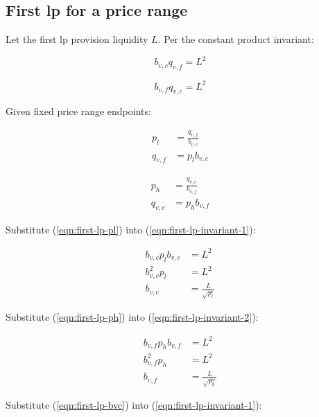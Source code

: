 \documentclass[table, twocolumn]{article}
\begin{document}
\subsection{First \gls{lp} for a price range}

Let the first \gls{lp} provision liquidity $L$. Per the constant product invariant:

\begin{equation} \label{eqn:first-lp-invariant-1}
  b_{v, c} q_{v, f} = L^2
\end{equation}

\begin{equation} \label{eqn:first-lp-invariant-2}
  b_{v, f} q_{v, c} = L^2
\end{equation}

Given fixed price range endpoints:

\begin{align} \label{eqn:first-lp-pl}
  p_l      & = \frac{q_{v, f}}{b_{v, c}} \nonumber \\
  q_{v, f} & = p_l b_{v, c}
\end{align}

\begin{align} \label{eqn:first-lp-ph}
  p_h      & = \frac{q_{v, c}}{b_{v, f}} \nonumber \\
  q_{v, c} & = p_h b_{v, f}
\end{align}

Substitute (\ref{eqn:first-lp-pl}) into (\ref{eqn:first-lp-invariant-1}):

\begin{align} \label{eqn:first-lp-bvc}
  b_{v, c} p_l b_{v, c} & = L^2 \nonumber        \\
  b_{v, c}^2 p_l        & = L^2 \nonumber        \\
  b_{v, c}              & = \frac{L}{\sqrt{p_l}}
\end{align}

Substitute (\ref{eqn:first-lp-ph}) into (\ref{eqn:first-lp-invariant-2}):

\begin{align} \label{eqn:first-lp-bvf}
  b_{v, f} p_h b_{v, f} & = L^2 \nonumber        \\
  b_{v, f}^2 p_h        & = L^2 \nonumber        \\
  b_{v, f}              & = \frac{L}{\sqrt{p_h}}
\end{align}

Substitute (\ref{eqn:first-lp-bvc}) into (\ref{eqn:first-lp-invariant-1}):
\end{document}

